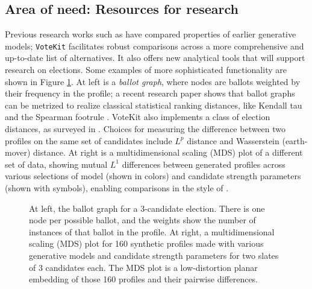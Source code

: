 \documentclass{article}
\newcommand{\VK}{{\tt VoteKit}\xspace}
\begin{document}

\FloatBarrier
\subsection{Area of need: Resources for research}

Previous research works such as \cite{elkind2017multiwinner} have compared properties of earlier generative models; \VK facilitates robust comparisons across a more comprehensive and up-to-date list of alternatives.  It also offers new analytical tools that will support research on elections.
Some examples of more sophisticated functionality are shown in Figure \ref{fig: votekit visualization}.  At left is a {\em ballot graph}, where nodes are ballots weighted by their frequency in the profile; a recent research paper shows that ballot graphs can be metrized to realize classical statistical ranking distances, like Kendall tau and the Spearman footrule \cite{duchin_tapp_24}. 
VoteKit also implements a class of election distances, as surveyed in \cite{distance-elex}.  Choices for measuring the difference between two profiles on the same set of candidates include $L^p$ distance and Wasserstein (earth-mover) distance.  
At right is a multidimensional scaling (MDS) plot of a different set of data, showing mutual $L^1$ differences between generated profiles across various selections of model (shown in colors) and candidate strength parameters (shown with symbols), enabling comparisons in the style of \cite{drawing-a-map}.  


\begin{figure}[bht!]
 \caption{At left, the ballot graph for a 3-candidate election.  There is one node per possible ballot, and the weights show the number of instances of that ballot in the profile.  At right, a multidimensional scaling (MDS) plot for 160 synthetic profiles made with various generative models and candidate strength parameters for two slates of 3 candidates each.  
The MDS plot is a low-distortion planar embedding of those 160 profiles and their pairwise differences.}
 \label{fig: votekit visualization}
\end{figure}
\end{document}
